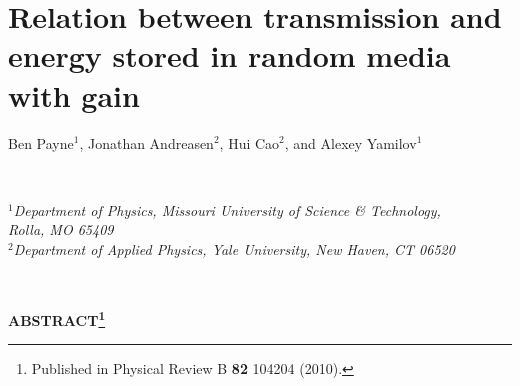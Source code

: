 
%

\chapter{Relation between transmission and energy stored in random media with gain}
\label{chap:TE_gain}
\label{paper:1_start}

\begin{center}
Ben Payne$^1$, Jonathan Andreasen$^2$, Hui Cao$^2$, and Alexey Yamilov$^1$      \label{sec:TE2009}                                                                         \end{center}

\ \\
\begin{center}
\textit{$^1$Department of Physics, Missouri University of Science \& Technology,\\ Rolla, MO 65409\\
$^2$Department of Applied Physics, Yale University, New Haven, CT 06520}\end{center}

\ \\
\begin{center}\textbf{ABSTRACT\footnote{Published in Physical Review B \textbf{82} 104204 (2010).}}        \end{center}

